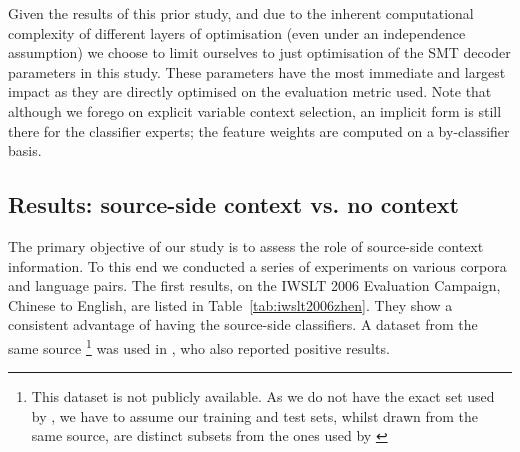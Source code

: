 \documentclass[smallextended]{svjour3}       %
\theoremstyle{break}
\begin{document}
Given the results of this prior study, and due to the inherent computational
complexity of different layers of optimisation (even under an independence
assumption) we choose to limit ourselves to just optimisation of the SMT
decoder parameters in this study. These parameters have the most immediate and
largest impact as they are directly optimised on the evaluation metric used.
Note that although we forego on explicit variable context selection, an
implicit form is still there for the classifier experts; the feature weights
are computed on a by-classifier basis.

\subsection{Results: source-side context vs. no context}
\label{sec:results1}

The primary objective of our study is to assess the role of
source-side context information. To this end we conducted a series of
experiments on various corpora and language pairs. The first results,
on the IWSLT 2006 Evaluation Campaign, Chinese to English, are listed
in Table~\ref{tab:iwslt2006zhen}. They show a consistent advantage of
having the source-side classifiers. A dataset from the same source
\footnote{This dataset is not publicly available. As we do not have the exact set used by
  \cite{Stroppa+07}, we have to assume our training and test sets,
  whilst drawn from the same source, are distinct subsets from the
  ones used by \cite{Stroppa+07}} was used in \cite{Stroppa+07}, who
also reported positive results.
\end{document}
